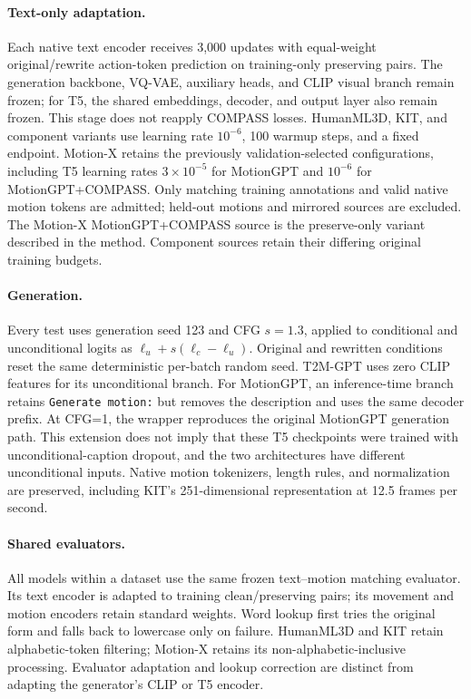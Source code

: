 \paragraph{Text-only adaptation.}
Each native text encoder receives 3,000 updates with equal-weight
original/rewrite action-token prediction on training-only preserving pairs.
The generation backbone, VQ-VAE, auxiliary heads, and CLIP visual branch remain
frozen; for T5, the shared embeddings, decoder, and output layer also remain
frozen. This stage does not reapply COMPASS losses. HumanML3D, KIT, and component
variants use learning rate $10^{-6}$, 100 warmup steps, and a fixed endpoint.
Motion-X retains the previously validation-selected configurations, including
T5 learning rates $3\times10^{-5}$ for MotionGPT and $10^{-6}$ for
MotionGPT+COMPASS. Only matching training annotations and valid native motion
tokens are admitted; held-out motions and mirrored sources are excluded.
The Motion-X MotionGPT+COMPASS source is the preserve-only variant described in
the method. Component sources retain their differing original training budgets.

\paragraph{Generation.}
Every test uses generation seed 123 and CFG $s=1.3$, applied to conditional
and unconditional logits as $\ell_u+s(\ell_c-\ell_u)$. Original and rewritten
conditions reset the same deterministic per-batch random seed. T2M-GPT uses
zero CLIP features for its unconditional branch. For MotionGPT, an
inference-time branch retains \texttt{Generate motion:} but removes the
description and uses the same decoder prefix. At CFG=1, the wrapper reproduces
the original MotionGPT generation path. This extension does not imply that
these T5 checkpoints were trained with unconditional-caption dropout, and the
two architectures have different unconditional inputs. Native motion
tokenizers, length rules, and normalization are preserved, including KIT's
251-dimensional representation at 12.5 frames per second.

\paragraph{Shared evaluators.}
All models within a dataset use the same frozen text--motion matching
evaluator. Its text encoder is adapted to training clean/preserving pairs;
its movement and motion encoders retain standard weights. Word lookup first
tries the original form and falls back to lowercase only on failure.
HumanML3D and KIT retain alphabetic-token filtering; Motion-X retains its
non-alphabetic-inclusive processing. Evaluator adaptation and lookup correction
are distinct from adapting the generator's CLIP or T5 encoder.

